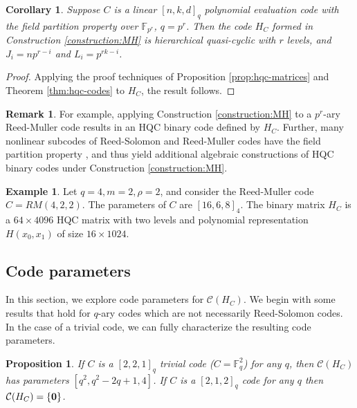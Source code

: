 \documentclass[11pt]{amsart}
\newtheorem{corollary}[theorem]{Corollary}
\newtheorem{proposition}[theorem]{Proposition}
\theoremstyle{definition}
\newtheorem{example}[theorem]{Example}
\newtheorem{remark}[theorem]{Remark}
\newcommand{\0}{\mathbf{0}}
\newcommand{\F}{\mathbb{F}}
\begin{document}
\begin{corollary}
    Suppose $C$ is a linear $[n, k, d]_q$ polynomial evaluation code with the field partition property over $\mathbb{F}_{p^r}$, $q=p^r$. Then the code $H_C$ formed in Construction \ref{construction:MH} is hierarchical quasi-cyclic with  $r$ levels, and $J_i = np^{r-i}$ and $L_i = p^{rk-i}$. 
\end{corollary}

\begin{proof}
    Applying the proof techniques of Proposition \ref{prop:hqc-matrices} and Theorem \ref{thm:hqc-codes} to $H_C$, the result follows.  
\end{proof}

\begin{remark}
    For example, applying Construction \ref{construction:MH} to a $p^r$-ary Reed-Muller code results in an HQC binary code defined by $H_C$. Further, many nonlinear subcodes of Reed-Solomon and Reed-Muller codes have the field partition property %
    , and thus yield additional algebraic constructions of HQC binary codes under Construction \ref{construction:MH}.  
\end{remark}

\begin{example} \label{ex:RM422}
    Let $q=4, m=2, \rho=2$, and consider the Reed-Muller code $C=RM(4, 2, 2)$. The parameters of $C$ are $[16, 6, 8]_4$. The binary matrix $H_C$ is a $64\times4096$ HQC matrix with two levels and polynomial representation $H(x_0, x_1)$ of size $16\times 1024$. 
\end{example}

\subsection{Code parameters} 

In this section, we explore code parameters for $\mathcal{C}(H_C)$. We begin with some results that hold for $q$-ary codes which are not necessarily Reed-Solomon codes. In the case of a trivial code, we can fully characterize the resulting code parameters.

\begin{proposition} If $C$ is a $[2, 2, 1]_q$ trivial code ($C=\F_q^2$) for any $q$, then $\mathcal{C}(H_{C})$  has parameters $[q^2, q^2-2q+1, 4]$. If $C$ is a $[2, 1, 2]_q$  code for any $q$ then $\mathcal{C}(H_{C})=\{\bf{0}\}$.
\end{proposition}
\end{document}

